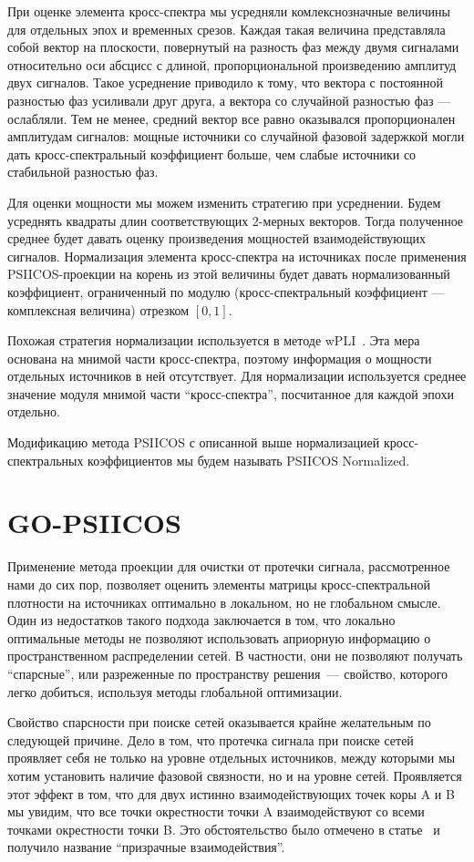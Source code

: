 При оценке элемента кросс-спектра мы усредняли комлекснозначные величины для
отдельных эпох и временных срезов.  Каждая такая величина представляла собой
вектор на плоскости, повернутый на разность фаз между двумя сигналами
относительно оси абсцисс с длиной, пропорциональной произведению амплитуд двух
сигналов.  Такое усреднение приводило к тому, что вектора с постоянной
разностью фаз усиливали друг друга, а вектора со случайной разностью фаз ---
ослабляли. Тем не менее, средний вектор все равно оказывался пропорционален
амплитудам сигналов: мощные источники со случайной фазовой задержкой могли дать
кросс-спектральный коэффициент больше, чем слабые источники со стабильной
разностью фаз.

Для оценки мощности мы можем изменить стратегию при усреднении. Будем усреднять
квадраты длин соответствующих 2-мерных векторов. Тогда полученное среднее
будет давать оценку произведения мощностей взаимодействующих сигналов.
Нормализация элемента кросс-спектра на источниках после применения PSIICOS-проекции
на корень из этой величины будет давать нормализованный коэффициент, ограниченный
по модулю (кросс-спектральный коэффициент --- комплексная величина) отрезком $[0, 1]$.

Похожая стратегия нормализации используется в методе wPLI~\cite{wPLI}.
Эта мера основана на мнимой части кросс-спектра, поэтому информация о мощности
отдельных источников в ней отсутствует. Для нормализации используется
среднее значение модуля мнимой части ``кросс-спектра'', посчитанное для
каждой эпохи отдельно.

Модификацию метода PSIICOS с описанной выше нормализацией кросс-спектральных
коэффициентов мы будем называть PSIICOS Normalized.

\section{GO-PSIICOS}\label{sec:gopsiicos}
Применение метода проекции для очистки от протечки сигнала, рассмотренное нами
до сих пор, позволяет оценить элементы матрицы кросс-спектральной плотности
на источниках оптимально в локальном, но не глобальном смысле.
Один из недостатков такого подхода заключается в том, что локально оптимальные
методы не позволяют использовать априорную информацию о пространственном распределении
сетей. В частности, они не позволяют получать ``спарсные'', или разреженные по пространству решения~---
свойство, которого легко добиться, используя методы глобальной оптимизации.

Свойство спарсности при поиске сетей оказывается крайне желательным по
следующей причине. Дело в том, что протечка сигнала при поиске сетей
проявляет себя не только на уровне отдельных источников, между которыми
мы хотим установить наличие фазовой связности, но и на уровне сетей.
Проявляется этот эффект в том, что для двух истинно взаимодействующих
точек коры A и B мы увидим, что все точки окрестности точки A взаимодействуют
со всеми точками окрестности точки B. Это обстоятельство было отмечено
в статье~\cite{Palva2018} и получило название ``призрачные взаимодействия''.

